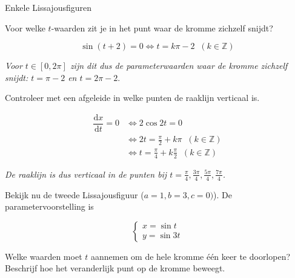 \begin{lesactiviteit}{Enkele Lissajousfiguren}
\begin{vraagenantwoord}
    \item Voor welke $t$-waarden zit je in het punt waar de kromme zichzelf snijdt?
    
    
    $$\sin(t+2)=0\Leftrightarrow t=k\pi-2\;\;(k\in\mathbb{Z})$$
    
    \emph{Voor $t\in[0,2\pi]$ zijn dit dus de parameterwaarden waar de kromme zichzelf snijdt: $t=\pi-2$ en $t=2\pi-2$}.
    
    \item Controleer met een afgeleide in welke punten de raaklijn verticaal is.
    
    
    $$
    \begin{array}{cl}
          \dfrac{\mathrm{d}x}{\mathrm{d}t}=0& \Leftrightarrow 2 \cos{2t}=0\\ 
          &\Leftrightarrow 2t=\frac{\pi}{2}+k\pi\;\;(k\in\mathbb{Z})\\
          &\Leftrightarrow t=\frac{\pi}{4}+k\frac{\pi}{2}\;\;(k\in\mathbb{Z})
    \end{array}
    $$
    
    \emph{De raaklijn is dus verticaal in de punten bij $t=\frac{\pi}{4}, \frac{3\pi}{4}, \frac{5\pi}{4}, \frac{7\pi}{4}$.}
    
    \end{vraagenantwoord}
    
    Bekijk nu de tweede Lissajousfiguur ($a=1, b=3, c=0)$). De parametervoorstelling is
    
    $$\left\{ 
    \begin{array}{l}
         x = \sin{t}\\
         y = \sin{3t}
    \end{array}
    \right.$$
    
    \begin{vraagenantwoord}[resume]
    
    \item Welke waarden moet $t$ aannemen om de hele kromme één keer te doorlopen? Beschrijf hoe het veranderlijk punt op de kromme beweegt.
    
    

\end{vraagenantwoord}
\end{lesactiviteit}
